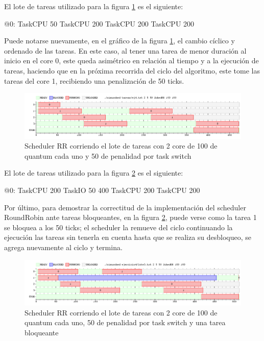 \documentclass[a4paper,10pt,twoside]{article}
\newenvironment{pseudo}[1][]{%
    \vspace{0.5em}%
    \begin{algorithmic}%
}
{%
    \end{algorithmic}%
    \vspace{0.5em}%
}
\begin{document}
El lote de tareas utilizado para la figura \ref{SchedRR2Core} es el siguiente:
\begin{pseudo}
	\State @0:
	\State TaskCPU 50
	\State TaskCPU 200
	\State TaskCPU 200
	\State TaskCPU 200
\end{pseudo}

Puede notarse nuevamente, en el gráfico de la figura \ref{SchedRR2Core}, el cambio cíclico y ordenado de las tareas. En este caso, al tener una tarea de menor duración al inicio en el core 0, este queda asimétrico en relación al tiempo y a la ejecución de tareas, haciendo que en la próxima recorrida del ciclo del algoritmo, este tome las tareas del core 1, recibiendo una penalización de 50 ticks.

\begin{figure}[ht!]
\centering
\includegraphics[width=175mm]{../ejercicio4/SchedRR2Core.png}
\caption{Scheduler RR corriendo el lote de tareas con 2 core de 100 de quantum cada uno y 50 de penalidad por task switch}
\label{SchedRR2Core}
\end{figure}

El lote de tareas utilizado para la figura \ref{SchedRR2CoreIO} es el siguiente:
\begin{pseudo}
	\State @0:
	\State TaskCPU 200
	\State TaskIO 50 400
	\State TaskCPU 200
	\State TaskCPU 200
\end{pseudo}

Por último, para demostrar la correctitud de la implementación del scheduler RoundRobin ante tareas bloqueantes, en la figura \ref{SchedRR2CoreIO}, puede verse como la tarea 1 se bloquea a los 50 ticks; el scheduler la remueve del ciclo continuando la ejecución las tareas sin tenerla en cuenta hasta que se realiza su desbloqueo, se agrega nuevamente al ciclo y termina.

\begin{figure}[ht!]
\centering
\includegraphics[width=175mm]{../ejercicio4/SchedRR2CoreIO.png}
\caption{Scheduler RR corriendo el lote de tareas con 2 core de 100 de quantum cada uno, 50 de penalidad por task switch y una tarea bloqueante}
\label{SchedRR2CoreIO}
\end{figure}
\end{document}
